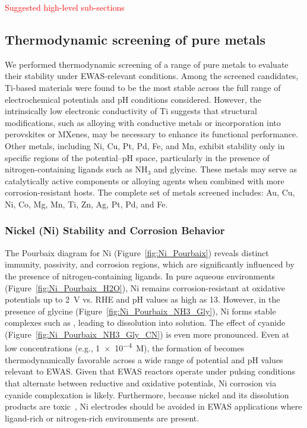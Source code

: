 \documentclass[journal=jacsat,manuscript=article]{achemso}
\begin{document}
\textcolor{red}{Suggested high-level sub-sections}
\subsection{Thermodynamic screening of pure metals}


We performed thermodynamic screening of a range of pure metals to evaluate their stability under EWAS-relevant conditions. Among the screened candidates, Ti-based materials were found to be the most stable across the full range of electrochemical potentials and pH conditions considered. However, the intrinsically low electronic conductivity of Ti suggests that structural modifications, such as alloying with conductive metals or incorporation into perovskites or MXenes, may be necessary to enhance its functional performance. Other metals, including Ni, Cu, Pt, Pd, Fe, and Mn, exhibit stability only in specific regions of the potential–pH space, particularly in the presence of nitrogen-containing ligands such as NH$_3$ and glycine. These metals may serve as catalytically active components or alloying agents when combined with more corrosion-resistant hosts. The complete set of metals screened includes: Au, Cu, Ni, Co, Mg, Mn, Ti, Zn, Ag, Pt, Pd, and Fe.


\subsubsection{Nickel (Ni) Stability and Corrosion Behavior}

The Pourbaix diagram for Ni (Figure~\ref{fig:Ni_Pourbaix}) reveals distinct immunity, passivity, and corrosion regions, which are significantly influenced by the presence of nitrogen-containing ligands. In pure aqueous environments (Figure~\ref{fig:Ni_Pourbaix_H2O}), Ni remains corrosion-resistant at oxidative potentials up to 2~V vs. RHE and pH values as high as 13. However, in the presence of glycine (Figure~\ref{fig:Ni_Pourbaix_NH3_Gly}), Ni forms stable complexes such as \ce{[Ni(Gly)_3]^{-}}, leading to dissolution into solution. The effect of cyanide (Figure~\ref{fig:Ni_Pourbaix_NH3_Gly_CN}) is even more pronounced. Even at low concentrations (e.g., \num{1e-4}~M), the formation of  becomes thermodynamically favorable across a wide range of potential and pH values relevant to EWAS. Given that EWAS reactors operate under pulsing conditions that alternate between reductive and oxidative potentials, Ni corrosion via cyanide complexation is likely. Furthermore, because nickel and its dissolution products are toxic~\cite{Bhattacharya2009CyanideTreatment}, Ni electrodes should be avoided in EWAS applications where ligand-rich or nitrogen-rich environments are present.
\end{document}
